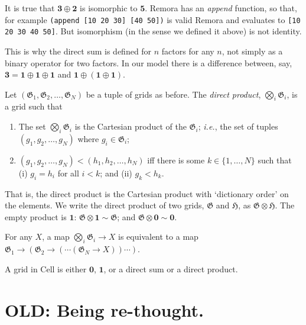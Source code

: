 \documentclass[11pt]{article}
\newcommand{\gr}[1]{\mathfrak{#1}}
\newcommand{\GG}{\gr{G}}
\newcommand{\void}{\mathbf{0}}
\newcommand{\unit}{\mathbf{1}}
\begin{document}
It is true that \(\mathbf{3}\oplus\mathbf{2}\) is isomorphic to \(\mathbf{5}\).
Remora has an \emph{append} function, so that, for example \texttt{(append [10
20 30] [40 50])} is valid Remora and evaluates to \texttt{[10 20 30 40 50]}. But isomorphism (in the sense we defined it above) is not identity.

This is why the direct sum is defined for $n$ factors for any $n$, not simply as
a binary operator for two factors. In our model there is a difference between,
say, $\mathbf{3} = \mathbf{1}\oplus\mathbf{1}\oplus\mathbf{1}$ and
$\mathbf{1}\oplus(\mathbf{1}\oplus\mathbf{1})$.

Let \((\GG_1, \GG_2, \dots, \GG_N)\) be a tuple of grids as before. The
\emph{direct product}, \(\bigotimes_i \GG_i\), is a grid such that
\begin{enumerate}
\item The set \(\bigotimes_i \GG_i\) is the Cartesian product of the \(\GG_i\);
  \emph{i.e.}, the set of tuples \((g_1, g_2, \dotsc, g_N)\) where
  \(g_i\in\GG_i\);
\item \((g_1, g_2, \dotsc, g_N) < (h_1, h_2, \dotsc, h_N)\) iff there is some
  \(k\in\{1, \dotsc, N\}\) such that (i) \(g_i = h_i\) for all \(i<k\); and (ii)
  \(g_k<h_k\).
\end{enumerate}
That is, the direct product is the Cartesian product with `dictionary order' on
the elements. We write the direct product of two grids, \(\gr{G}\) and
\(\gr{H}\), as \(\gr{G}\otimes\gr{H}\). The empty product is \(\unit\): \(\GG\otimes\unit\sim
\GG\); and \(\GG\otimes\void \sim \void\).

For any \(X\), a map \(\bigotimes_i\GG_i \to X\) is equivalent to a map \(\GG_1 \to
(\GG_2 \to (\dotsm (\GG_N \to X))\dotsm )\).






A grid in Cell is either \(\void\), \(\unit\), or a direct sum or a direct product. 






\section{OLD: Being re-thought.}
\label{sec:org0f361a3}
\end{document}
